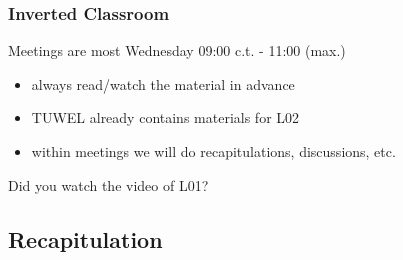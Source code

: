 \begin{frame}
	\frametitle{Inverted Classroom}
	Meetings are most Wednesday 09:00 c.t. - 11:00 (max.)

	\begin{itemize}
		\item always read/watch the material in advance
		\item TUWEL already contains materials for L02
		\item within meetings we will do recapitulations, discussions, etc.
	\end{itemize}

	\begin{task}
	Did you watch the video of L01?
	\end{task}
\end{frame}


\subsection{Recapitulation}

